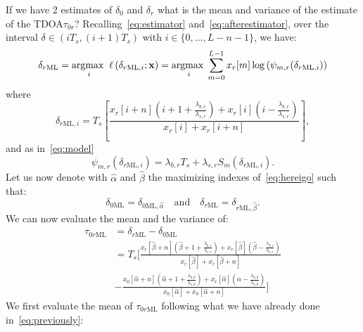 \noindent
If we have 2 estimates of \(\delta_0\) and \(\delta_r\) what is the mean and variance of the estimate of the TDOA\(\tau_{0r}\)? Recalling~\eqref{eq:estimator} and~\eqref{eq:afterestimator}, over the interval \(\delta \in(iT_s,(i+1)T_s)\) with \(i\in\{0, \ldots, L-n-1\}\), we have:
\begin{equation}
\begin{aligned}
\delta_{r\mathrm{ML}}=\underset{i}{\operatorname*{argmax\;}} \; \ell\left(\delta_{r\mathrm{ML}, i} ; \mathbf{x}\right)
=\underset{i}{\operatorname*{argmax\;}} 
\sum_{m=0}^{L-1} x_r[m] \log \left( \psi_{m,r}(\delta_{r\mathrm{ML}, i})\right)
\end{aligned}
\label{eq:hereigo}
\end{equation}
where
\begin{equation}
\delta_{r\mathrm{ML}, i}=T_s\left[\frac{x_r[i+n]\left(i+1 +\frac{\lambda_{b,r}}{\lambda_{s,r}} \right)+x_r[i]\left(i -\frac{\lambda_{b,r}}{\lambda_{s,r}} \right)}{x_r[i]+x_r[i+n]}\right],
\end{equation}
and as in~\eqref{eq:model}
\begin{equation}
\psi_{m,r}(\delta_{r\mathrm{ML}, i})=\lambda_{b,r}T_s+\lambda_{s,r} S_m\left(\delta_{r\mathrm{ML}, i}\right).
\end{equation}
Let us now denote with \(\hat{\alpha}\) and \(\hat{\beta}\) the maximizing indexes of~\eqref{eq:hereigo} such that:
\begin{equation}
\delta_{0\mathrm{ML}}=\delta_{0\mathrm{ML}, \hat{\alpha}} 
\quad \text{and}\quad 
\delta_{r\mathrm{ML}}=\delta_{r\mathrm{ML}, \hat{\beta}}.
\label{eq:thebetas}
\end{equation}
We can now evaluate the mean and the variance of:
\begin{equation}
\begin{split}
\tau_{0r\mathrm{ML}}
& =\delta_{r\mathrm{ML}}-\delta_{0\mathrm{ML}}\\
& =
T_s
\Biggl[
\frac{x_r[\hat{\beta}+n]\left(\hat{\beta}+1 +\frac{\lambda_{b,r}}{\lambda_{s,r}} \right)+x_r[\hat{\beta}]\left(\hat{\beta} -\frac{\lambda_{b,r}}{\lambda_{s,r}} \right)}{x_r[\hat{\beta}]+x_r[\hat{\beta}+n]}\\
&-
\frac{x_0[\hat{\alpha}+n]\left(\hat{\alpha}+1 +\frac{\lambda_{b,0}}{\lambda_{s,0}} \right)+x_r[\hat{\alpha}]\left(\hat{\alpha} -\frac{\lambda_{b,0}}{\lambda_{s,0}} \right)}{x_0[\hat{\alpha}]+x_0[\hat{\alpha}+n]}
\Biggr]
\end{split}
\end{equation}
We first evaluate the mean of \(\tau_{0r\mathrm{ML}}\) following what we have already done in~\eqref{eq:previously}:
